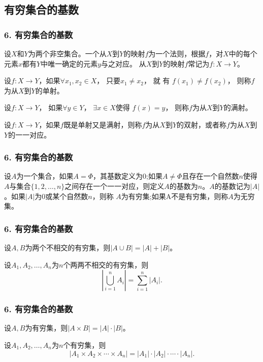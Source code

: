 \documentclass{beamer}
\begin{document}
\begin{CJK*}{UTF8}{gbsn}
\section{有穷集合的基数}
\begin{frame}
  \frametitle{6. 有穷集合的基数}
  \begin{Def}
    设$X$和$Y$为两个非空集合。一个从$X$到$Y$的\alert{映射}$f$为一个法则，根据$f$，对$X$中的每个元素$x$都有$Y$中唯一确定的元素$y$与之对应。
    从$X$到$Y$的映射$f$常记为$f:X\to Y$。
  \end{Def}
    \begin{Def}
    设$f:X\to Y$，如果$\forall x_1, x_2 \in X$， 只要$x_1 \neq x_2$，  就 有 $f(x_1) \neq f(x_2)$，   则称$f$为从$X$到$Y$的\alert{单射}。
  \end{Def}
  \begin{Def}
    设$f:X\to Y$， 如果$\forall y \in Y$， $\exists x \in X$使得 $f(x) = y$， 则称$f$为从$X$到$Y$的\alert{满射}。
  \end{Def}
  \begin{Def}
    设$f:X\to Y$，如果$f$既是单射又是满射，则称$f$为从$X$到$Y$的\alert{双射}，或者称$f$为从$X$到$Y$的\alert{一一对应}。
  \end{Def}
\end{frame}

\begin{frame}
  \frametitle{6. 有穷集合的基数}

  \begin{Def}
设$A$为一个集合，如果$A=\Phi$，其\alert{基数}定义为$0$;如果$A \neq \Phi$且存在一个自然数$n$使得$A$与集合$\{1,2,\ldots, n\}$之间存在一个一一对应，则定义$A$的\alert{基数}为$n$。$A$的基数记为$|A|$。如果$|A|$为0或某个自然数$n$，则称
$A$为\alert{有穷集};如果A不是有穷集，则称$A$为\alert{无穷集}。   
  \end{Def}
\end{frame}

\begin{frame}
  \frametitle{6. 有穷集合的基数}
  \begin{Thm}
    设$A,B$为两个不相交的有穷集，则$|A \cup B| = |A| + |B|$。
  \end{Thm}
\pause
  \begin{Thm}
    设$A_1,A_2, \ldots, A_n$为$n$个两两不相交的有穷集，则\[|\bigcup_{i=1}^{n}A_i|=\sum_{i=1}^{n}|A_i|.\]
  \end{Thm}
\end{frame}

\begin{frame}
  \frametitle{6. 有穷集合的基数}
  \begin{Thm}
    设$A,B$为有穷集，则$|A \times B| = |A| \cdot |B|$。
  \end{Thm}
\pause
  \begin{Thm}
    设$A_1,A_2, \ldots, A_n$为$n$个有穷集，则\[|A_1 \times A_2 \times \cdots \times A_n|=|A_1|\cdot |A_2| \cdot \cdots \cdot |A_n|.\]
  \end{Thm}
\end{frame}


\end{CJK*}
\end{document}
